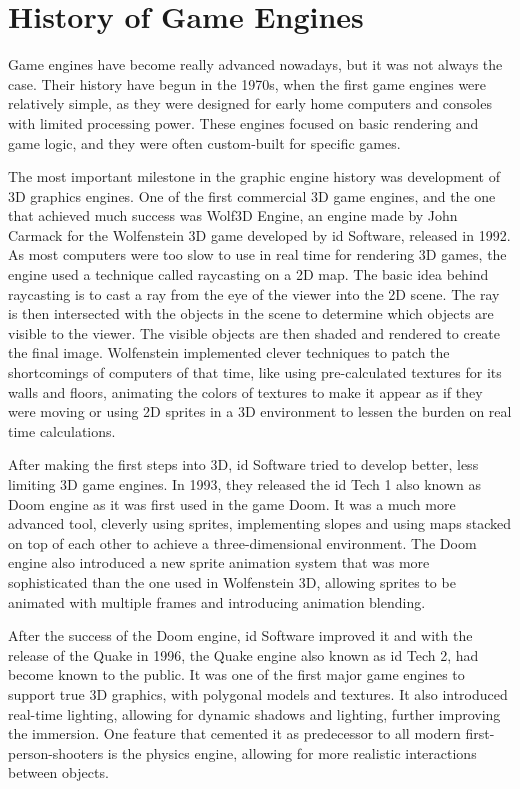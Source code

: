 \newpage
\section{History of Game Engines}
\label{sec:history_game_engines}
\hspace{\parindent}
Game engines have become really advanced nowadays, but it was not always the case. Their history have begun in the 1970s, when the first game engines were relatively simple, as they were designed for early home computers and consoles with limited processing power. These engines focused on basic rendering and game logic, and they were often custom-built for specific games.

The most important milestone in the graphic engine history was development of 3D graphics engines. One of the first commercial 3D game engines, and the one that achieved much success was Wolf3D Engine, an engine made by John Carmack for the Wolfenstein 3D game developed by id Software, released in 1992. As most computers were too slow to use in real time for rendering 3D games, the engine used a technique called raycasting on a 2D map. The basic idea behind raycasting is to cast a ray from the eye of the viewer into the 2D scene. The ray is then intersected with the objects in the scene to determine which objects are visible to the viewer. The visible objects are then shaded and rendered to create the final image. Wolfenstein implemented clever techniques to patch the shortcomings of computers of that time, like using pre-calculated textures for its walls and floors, animating the colors of textures to make it appear as if they were moving or using 2D sprites in a 3D environment to lessen the burden on real time calculations.

After making the first steps into 3D, id Software tried to develop better, less limiting 3D game engines. In 1993, they released the id Tech 1 also known as Doom engine as it was first used in the game Doom. It was a much more advanced tool, cleverly using sprites, implementing slopes and using maps stacked on top of each other to achieve a three-dimensional environment. The Doom engine also introduced a new sprite animation system that was more sophisticated than the one used in Wolfenstein 3D, allowing sprites to be animated with multiple frames and introducing animation blending. 

After the success of the Doom engine, id Software improved it and with the release of the Quake in 1996, the Quake engine also known as id Tech 2, had become known to the public. It was one of the first major game engines to support true 3D graphics, with polygonal models and textures. It also introduced real-time lighting, allowing for dynamic shadows and lighting, further improving the immersion. One feature that cemented it as predecessor to all modern first-person-shooters is the physics engine, allowing for more realistic interactions between objects.

